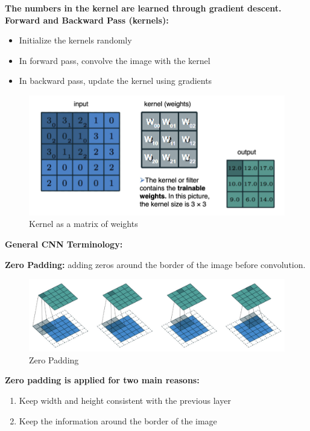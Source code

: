 \textbf{The numbers in the kernel are learned through gradient descent.} \\

\textbf{Forward and Backward Pass (kernels):}
\begin{itemize}
    \item Initialize the kernels randomly
    \item In forward pass, convolve the image with the kernel
    \item In backward pass, update the kernel using gradients
\end{itemize}

\begin{figure}[h!t]
    \centering
    \includegraphics[width=0.5\linewidth]{forwardbackwardpass.png}
    \caption{Kernel as a matrix of weights}
    \label{fig:enter-label}
\end{figure}
\textbf{General CNN Terminology:}

\begin{definition}
    \textbf{Zero Padding:} adding zeros around the border of the image before convolution.
\end{definition}

\begin{figure}[h!t]
    \centering
    \includegraphics[width=0.75\linewidth]{zeropadding.png}
    \caption{Zero Padding}
    \label{fig:enter-label}
\end{figure}

\textbf{Zero padding is applied for two main reasons:}
\begin{enumerate}
    \item Keep width and height consistent with the previous layer
    \item Keep the information around the border of the image
\end{enumerate}

